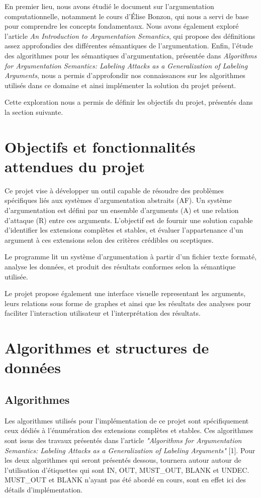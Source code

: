 \documentclass{rapportECL}
\begin{document}
En premier lieu, nous avons étudié le document sur l'argumentation computationnelle, notamment le cours d'Élise Bonzon, qui nous a servi de base pour comprendre les concepts fondamentaux. 
Nous avons également exploré l'article \textit{An Introduction to Argumentation Semantics}, qui propose des définitions assez approfondies des différentes sémantiques de l'argumentation. 
Enfin, l’étude des algorithmes pour les sémantiques d'argumentation, présentée dans \textit{Algorithms for Argumentation Semantics: Labeling Attacks as a Generalization of Labeling Arguments}, 
nous a permis d’approfondir nos connaissances sur les algorithmes utilisés dans ce domaine et ainsi implémenter la solution du projet présent. 

Cette exploration nous a permis de définir les objectifs du projet, présentés dans la section suivante.

\section{Objectifs et fonctionnalités attendues du projet}
Ce projet vise à développer un outil capable de résoudre des problèmes spécifiques liés aux systèmes d'argumentation abstraits (AF). 
Un système d'argumentation est défini par un ensemble d'arguments (A) et une relation d'attaque (R) entre ces arguments. 
L'objectif est de fournir une solution capable d’identifier les extensions complètes et stables, et évaluer l’appartenance 
d’un argument à ces extensions selon des critères crédibles ou sceptiques.

Le programme lit un système d'argumentation à partir d'un fichier texte formaté, analyse les données, et produit des résultats conformes selon la sémantique utilisée. 


Le projet propose également une interface visuelle  representant les arguments, leurs relations sous forme de graphes et ainsi que les résultats des analyses pour faciliter l’interaction utilisateur et l’interprétation des résultats.

\section{Algorithmes et structures de données} 


\subsection{Algorithmes}
Les algorithmes utilisés pour l'implémentation de ce projet sont spécifiquement ceux dédiés à l'énumération des extensions complètes 
et stables. Ces algorithmes sont issus des travaux présentés dans l'article 
\textit{"Algorithms for Argumentation Semantics: Labeling Attacks as a Generalization of Labeling Arguments"} [1].
Pour les deux algorithmes qui seront présentés dessous, tournera autour autour de l'utilisation d'étiquettes qui sont IN, OUT,  {MUST\_OUT}, BLANK et UNDEC.
{MUST\_OUT} et BLANK n'ayant pas été abordé en cours, sont en effet ici des détails d'implémentation.
\end{document}
